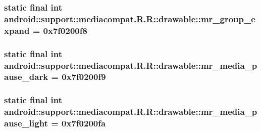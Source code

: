 \hypertarget{classandroid_1_1support_1_1mediacompat_1_1_r_1_1drawable_47a3491a44e0fe164d1c15652b5d8fb9}{
\subsubsection[{mr\_\-group\_\-expand}]{\setlength{\rightskip}{0pt plus 5cm}static final int android::support::mediacompat.R.R::drawable::mr\_\-group\_\-expand = 0x7f0200f8}}
\label{classandroid_1_1support_1_1mediacompat_1_1_r_1_1drawable_47a3491a44e0fe164d1c15652b5d8fb9}


\hypertarget{classandroid_1_1support_1_1mediacompat_1_1_r_1_1drawable_44a41bfecdffbcf2e3bac6930f240bdd}{
\subsubsection[{mr\_\-media\_\-pause\_\-dark}]{\setlength{\rightskip}{0pt plus 5cm}static final int android::support::mediacompat.R.R::drawable::mr\_\-media\_\-pause\_\-dark = 0x7f0200f9}}
\label{classandroid_1_1support_1_1mediacompat_1_1_r_1_1drawable_44a41bfecdffbcf2e3bac6930f240bdd}


\hypertarget{classandroid_1_1support_1_1mediacompat_1_1_r_1_1drawable_796a71bc4eb74745588d70c98bacbf96}{
\subsubsection[{mr\_\-media\_\-pause\_\-light}]{\setlength{\rightskip}{0pt plus 5cm}static final int android::support::mediacompat.R.R::drawable::mr\_\-media\_\-pause\_\-light = 0x7f0200fa}}
\label{classandroid_1_1support_1_1mediacompat_1_1_r_1_1drawable_796a71bc4eb74745588d70c98bacbf96}



